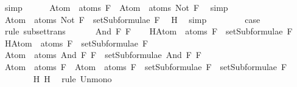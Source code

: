 \begin{isabellebody}
\ simp\isanewline
\ \ \ \ \isamarkupfalse%
\ {\isachardoublequoteopen}Atom\ {\isacharbackquote}\ atoms\ F\ {\isacharequal}\ Atom\ {\isacharbackquote}\ atoms\ {\isacharparenleft}Not\ F{\isacharparenright}{\isachardoublequoteclose}\ \isamarkupfalse%
\ simp\ \isanewline
\ \ \ \ \isamarkupfalse%
\ \isamarkupfalse%
\ {\isachardoublequoteopen}Atom\ {\isacharbackquote}\ atoms\ {\isacharparenleft}Not\ F{\isacharparenright}\ {\isasymsubseteq}\ setSubformulae\ F{\isachardoublequoteclose}\ \isamarkupfalse%
\ H\ \isamarkupfalse%
\ simp\ \isanewline
\ \ \ \ \isamarkupfalse%
\ \isamarkupfalse%
\ {\isacharquery}case\ \isamarkupfalse%
\ {}\ \isamarkupfalse%
\ {\isacharparenleft}rule\ subset{\isacharunderscore}trans{\isacharparenright}\isanewline
\ \ \isamarkupfalse%
\isanewline
{}\isamarkupfalse%
\isanewline
\ \ \isamarkupfalse%
\ {\isacharparenleft}And\ F{}\ F{}{\isacharparenright}\isanewline
\ \ \isamarkupfalse%
\ H{}{\isacharcolon}{\isachardoublequoteopen}Atom\ {\isacharbackquote}\ atoms\ F{}\ {\isasymsubseteq}\ setSubformulae\ F{}{\isachardoublequoteclose}\isanewline
\ \ \isamarkupfalse%
\ H{}{\isacharcolon}{\isachardoublequoteopen}Atom\ {\isacharbackquote}\ atoms\ F{}\ {\isasymsubseteq}\ setSubformulae\ F{}{\isachardoublequoteclose}\isanewline
\ \ \isamarkupfalse%
\ {\isachardoublequoteopen}Atom\ {\isacharbackquote}\ atoms\ {\isacharparenleft}And\ F{}\ F{}{\isacharparenright}\ {\isasymsubseteq}\ setSubformulae\ {\isacharparenleft}And\ F{}\ F{}{\isacharparenright}{\isachardoublequoteclose}\isanewline
\ \ \isamarkupfalse%
\ {\isacharminus}\isanewline
\ \ \ \ \isamarkupfalse%
\ {}{\isacharcolon}{\isachardoublequoteopen}{\isacharparenleft}Atom\ {\isacharbackquote}\ atoms\ F{}{\isacharparenright}\ {\isasymunion}\ {\isacharparenleft}Atom\ {\isacharbackquote}\ atoms\ F{}{\isacharparenright}\ {\isasymsubseteq}\ setSubformulae\ F{}\ {\isasymunion}\ setSubformulae\ F{}{\isachardoublequoteclose}\ \isanewline
\ \ \ \ \ \ \isamarkupfalse%
\ H{}\ H{}\ \isamarkupfalse%
\ {\isacharparenleft}rule\ Un{\isacharunderscore}mono{\isacharparenright}\isanewline

\end{isabellebody}
